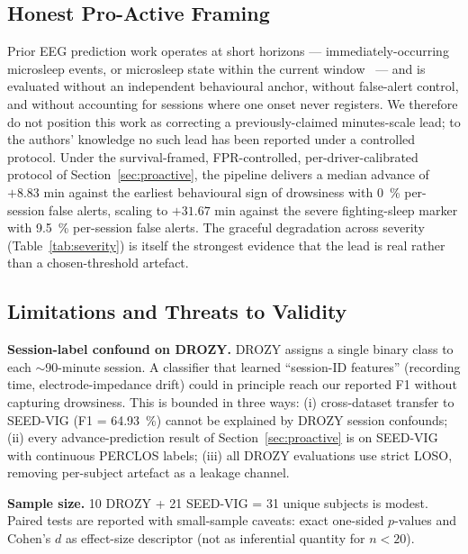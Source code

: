 \documentclass[journal]{IEEEtran}
\DeclareRobustCommand{\add}[1]{#1}                         %
\DeclareRobustCommand{\del}[1]{}                           %
\DeclareRobustCommand{\add}[1]{\hl{#1}}
\DeclareRobustCommand{\del}[1]{{\color{delred}\sout{#1}}\,}
\DeclareRobustCommand{\del}[1]{}                         %
\DeclareRobustCommand{\chg}[2]{\del{#1}\add{#2}}
\begin{document}
\subsection{Honest Pro-Active Framing}
\chg{Earlier reports of ``5--10 minute advance EEG warning'' were obtained under unprotected protocols that fitted thresholds on labelled drowsy data and silently dropped subjects with one missing onset.}{Prior EEG prediction work operates at short horizons --- immediately-occurring microsleep events, or microsleep state within the current window~\mbox{\cite{golz2016microsleep,buriro2018microsleep}} --- and is evaluated without an independent behavioural anchor, without false-alert control, and without accounting for sessions where one onset never registers. We therefore do not position this work as correcting a previously-claimed minutes-scale lead; to the authors' knowledge no such lead has been reported under a controlled protocol.} Under the survival-framed, FPR-controlled, per-driver-calibrated protocol of Section~\ref{sec:proactive}, the pipeline delivers a median advance of \(+8.83\) min against the earliest behavioural sign of drowsiness with 0~\% per-session false alerts, scaling to \(+31.67\) min against the severe fighting-sleep marker with 9.5~\% per-session false alerts. The graceful degradation across severity (Table~\ref{tab:severity}) is itself the strongest evidence that the lead is real rather than a chosen-threshold artefact.

\subsection{Limitations and Threats to Validity}
\label{sec:limitations}

\textbf{Session-label confound on DROZY.} DROZY assigns a single binary class to each \(\sim\)90-minute session. A classifier that learned ``session-ID features'' (recording time, electrode-impedance drift) could in principle reach our reported F1 without capturing drowsiness. This is bounded in three ways: (i) cross-dataset transfer to SEED-VIG (F1 = 64.93~\%) cannot be explained by DROZY session confounds; (ii) every advance-prediction result of Section~\ref{sec:proactive} is on SEED-VIG with continuous PERCLOS labels; (iii) all DROZY evaluations use strict LOSO, removing per-subject artefact as a leakage channel.

\textbf{Sample size.} 10 DROZY + 21 SEED-VIG = 31 unique subjects is modest. Paired tests are reported with small-sample caveats: exact one-sided \(p\)-values and Cohen's \(d\) as effect-size descriptor (not as inferential quantity for \(n < 20\)).
\end{document}
